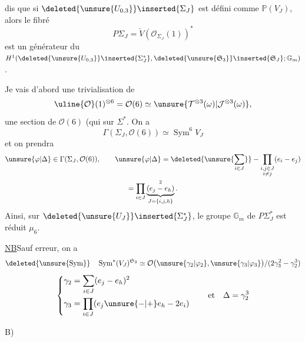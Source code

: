  dis que si 
$\deleted{\unsure{U_{0,3}}}\inserted{\Sigma_J}$ est défini comme $\mathbb P(V_J)$, 
alors le fibré 
\[
P\Sigma_J=\check V(\mathcal O_{\Sigma_J}(1))^{*}
\]
est un générateur du
$H^1(\deleted{\unsure{U_{0,3}}}\inserted{\Sigma_J^*},
\deleted{\unsure{\mathfrak S_3}}\inserted{\mathfrak S_J};\mathbb G_m)$.

Je vais d'abord  une trivialisation de
\[
\uline{\mathcal O}(1)^{\otimes6}=\mathcal O(6)\simeq
\unsure{\mathcal T^{\otimes3}(\omega)|\mathcal J^{\otimes3}(\omega)},
\]
  une section de $\mathcal O(6)$
(qui 
 sur $\Sigma^*$.
On  a
\[
\Gamma(\Sigma_J,\mathcal O(6))\simeq\operatorname{Sym}^{6}V_J
\]
et on prendra
\[
\begin{gathered}
\unsure{\varphi|\Delta}\in\Gamma(\Sigma_J,\mathcal O(6)),\qquad
\unsure{\varphi|\Delta}
=\deleted{\unsure{\sum_{i\in J}}}
-\prod_{\substack{i,j\in J\\i\ne j}}(e_i-e_j)\\
=\prod_{i\in J}\underbrace{(e_j-e_h)}_{J=\{i,j,h\}}^{2}.
\end{gathered}
\]
Ainsi, sur $\deleted{\unsure{U_J}}\inserted{\Sigma_J^{*}}$, le groupe 
$\mathbb G_m$ de $P\Sigma_J^{*}$ est réduit  $\mu_6$.

\uline{NB}\quad Sauf erreur, on a
\[
\deleted{\unsure{\operatorname{Sym}}}\quad
\operatorname{Sym}^{*}(V_J)^{\mathfrak S_3}\simeq
\mathcal O\bigl(\unsure{\gamma_2|\varphi_2},\unsure{\gamma_3|\varphi_3}\bigr)
/(2\gamma_3^2-\gamma_2^3)
\]
\[
\left\{\begin{aligned}
\gamma_2&=\sum_{i\in J}(e_j-e_h)^2\\
\gamma_3&=\prod_{i\in J}(e_j\unsure{-|+}e_h-2e_i)
\end{aligned}\right.
\qquad\text{et}\quad\Delta=\gamma_2^3
\]


B)

